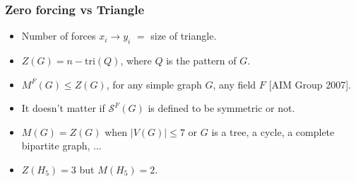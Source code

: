 \documentclass{beamer}
\begin{document}
\begin{frame}
\frametitle{Zero forcing vs Triangle}
\begin{itemize}
\item Number of \alert{forces} $x_i\rightarrow y_i$ $=$ \alert{size} of triangle.
\item $Z(G)=n-\text{tri}(Q)$, where $Q$ is the pattern of $G$.
\item $M^F(G)\leq Z(G)$, for any simple graph $G$, any field $F$ \nocite{AIM}[AIM Group 2007].
\item It doesn't matter if $\mathcal{S}^F(G)$ is defined to be symmetric or not.
\item $M(G)=Z(G)$ when $|V(G)|\leq 7$ or $G$ is a tree, a cycle, a complete bipartite graph, ...
\item $Z(H_5)=3$ but $M(H_5)=2$.
\end{itemize}
\end{frame}

\end{document}
